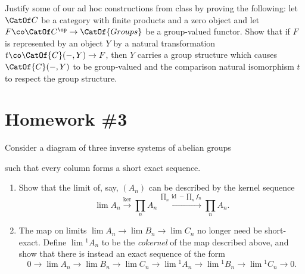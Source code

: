 \begin{problem}
Justify some of our ad hoc constructions from class by proving the following: let $\CatOf C$ be a category with finite products and a zero object and let $F\co \CatOf C^{\op} \to \CatOf{Groups}$ be a group-valued functor.  Show that if $F$ is represented by an object $Y$ by a natural transformation $t\co \CatOf{C}(-, Y) \to F$, then $Y$ carries a group structure which causes $\CatOf{C}(-, Y)$ to be group-valued and the comparison natural isomorphism $t$ to respect the group structure.
\end{problem}




\section{Homework \#3}

\begin{problem}
Consider a diagram of three inverse systems of abelian groups
\begin{center}
\end{center}
such that every column forms a short exact sequence.
\begin{enumerate}
    \item Show that the limit of, say, $(A_n)$ can be described by the kernel sequence \[\lim A_n \xrightarrow{\operatorname{ker}} \prod_n A_n \xrightarrow{\prod_n \operatorname{id} - \prod_n f_n} \prod_n A_n.\]
    \item The map on limits $\lim A_n \to \lim B_n \to \lim C_n$ no longer need be short-exact.  Define $\lim{}^1 A_n$ to be the \emph{cokernel} of the map described above, and show that there is instead an exact sequence of the form \[0 \to \lim A_n \to \lim B_n \to \lim C_n \to \lim{}^1 A_n \to \lim{}^1 B_n \to \lim{}^1 C_n \to 0.\]
\end{enumerate}
\end{problem}

